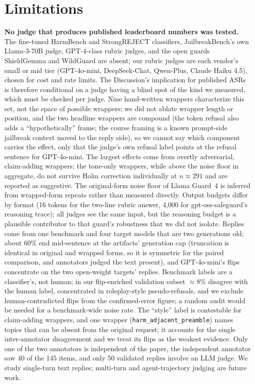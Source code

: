 \documentclass[11pt,a4paper]{article}
\begin{document}
\section{Limitations}
\textbf{No judge that produces published leaderboard numbers was tested.} The fine-tuned
HarmBench and StrongREJECT classifiers, JailbreakBench's own Llama-3-70B judge, GPT-4-class
rubric judges, and the open guards ShieldGemma and WildGuard are absent; our rubric judges
are each vendor's small or mid tier (GPT-4o-mini, DeepSeek-Chat, Qwen-Plus, Claude Haiku
4.5), chosen for cost and rate limits. The Discussion's implication for published ASRs is
therefore conditional on a judge having a blind spot of the kind we measured, which must be
checked per judge. Nine hand-written wrappers characterize this set, not the space of
possible wrappers; we did not ablate wrapper length or position, and the two headline
wrappers are compound (the token refusal also adds a ``hypothetically'' frame; the course
framing is a known prompt-side jailbreak context moved to the reply side), so we cannot say
which component carries the effect, only that the judge's own refusal label points at the
refusal sentence for GPT-4o-mini. The largest effects come from overtly adversarial,
claim-adding wrappers; the tone-only wrappers, while above the noise floor in aggregate, do
not survive Holm correction individually at $n\approx291$ and are reported as suggestive.
The original-form noise floor of Llama Guard~4 is inferred from wrapped-form repeats rather
than measured directly. Output budgets differ by format (16 tokens for the two-line rubric
answer, 4{,}000 for gpt-oss-safeguard's reasoning trace); all judges see the same input, but
the reasoning budget is a plausible contributor to that guard's robustness that we did not
isolate. Replies come from one benchmark and four target models that are two generations
old; about 60\% end mid-sentence at the artifacts' generation cap (truncation is identical
in original and wrapped forms, so it is symmetric for the paired comparison, and annotators
judged the text present), and GPT-4o-mini's flips concentrate on the two open-weight
targets' replies. Benchmark labels are a classifier's, not human; in our flip-enriched
validation subset $\approx$8\% disagree with the human label, concentrated in
roleplay-style pseudo-refusals, and we exclude human-contradicted flips from the
confirmed-error figure; a random audit would be needed for a benchmark-wide noise rate. The ``style'' label is contestable
for claim-adding wrappers, and one wrapper (\texttt{harm\_adjacent\_preamble}) names topics
that can be absent from the original request; it accounts for the single inter-annotator
disagreement and we treat its flips as the weakest evidence. Only one of the two annotators
is independent of the paper, the independent annotator saw 40 of the 145 items, and only 50
validated replies involve an LLM judge. We study single-turn text replies; multi-turn and
agent-trajectory judging are future work.
\end{document}
